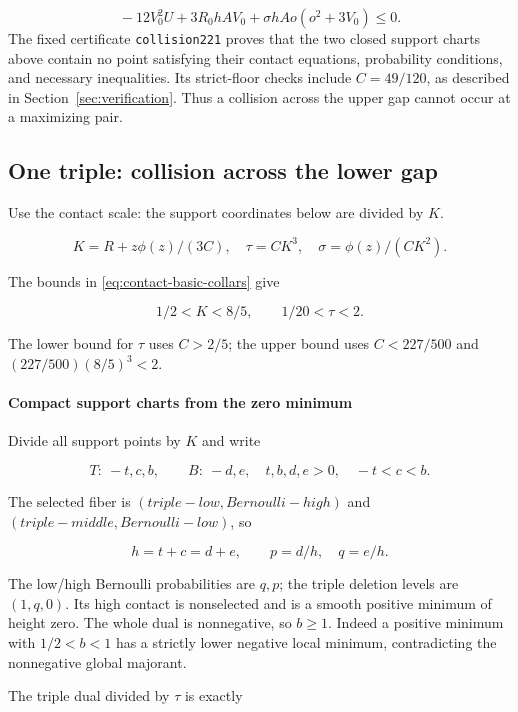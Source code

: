 \[
 \boxed{\quad
 -12V_0^2U+3R_0hAV_0+\sigma hAo(o^2+3V_0)\leq0.
 \quad}
\tag{B.15.17}\label{contact:collision-221-contact-reduction-17}
\]
The fixed certificate \texttt{collision221} proves that the two closed
support charts above contain no point satisfying their contact equations,
probability conditions, and necessary inequalities. Its strict-floor
checks include $C=49/120$, as described in Section~\ref{sec:verification}.
Thus a collision across the upper gap cannot occur at a maximizing pair.

\subsection{One triple: collision across the lower gap}\label{contact:collision-210-contact-reduction}

Use the contact scale: the support coordinates below are divided by $K$.


\[
 K=R+z\phi(z)/(3C),\quad \tau=CK^3,
 \quad \sigma=\phi(z)/(CK^2).
\]

The bounds in \eqref{eq:contact-basic-collars} give

\[
 \boxed{\quad 1/2<K<8/5,\qquad 1/20<\tau<2.\quad}
\tag{B.16.1}\label{contact:collision-210-contact-reduction-1}
\]

The lower bound for $\tau$ uses $C>2/5$; the upper bound uses
$C<227/500$ and $(227/500)(8/5)^3<2$.

\paragraph{Compact support charts from the zero minimum}

Divide all support points by $K$ and write

\[
 T:\ -t,c,b,\qquad B:\ -d,e,
 \quad t,b,d,e>0,\quad -t<c<b.
\]

The selected fiber is $(triple-low, Bernoulli-high)$ and
$(triple-middle, Bernoulli-low)$, so

\[
 h=t+c=d+e,\qquad p=d/h,\quad q=e/h.
\tag{B.16.2}\label{contact:collision-210-contact-reduction-2}
\]

The low/high Bernoulli probabilities are $q,p$; the triple deletion
levels are $(1,q,0)$. Its high contact is nonselected and is a smooth
positive minimum of height zero. The whole dual is nonnegative, so
$b\ge 1$. Indeed a positive minimum with $1/2<b<1$ has a strictly lower
negative local minimum, contradicting the nonnegative global majorant.

The triple dual divided by $\tau$ is exactly

